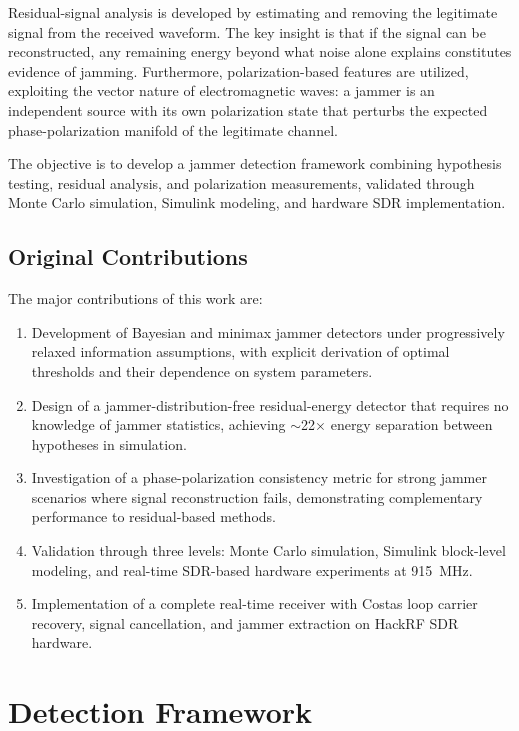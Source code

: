 \documentclass{article}
\begin{document}
Residual-signal analysis is developed by estimating and removing the legitimate signal from the received waveform. The key insight is that if the signal can be reconstructed, any remaining energy beyond what noise alone explains constitutes evidence of jamming. Furthermore, polarization-based features are utilized, exploiting the vector nature of electromagnetic waves: a jammer is an independent source with its own polarization state that perturbs the expected phase-polarization manifold of the legitimate channel.

The objective is to develop a jammer detection framework combining hypothesis testing, residual analysis, and polarization measurements, validated through Monte Carlo simulation, Simulink modeling, and hardware SDR implementation.

\subsection*{Original Contributions}

The major contributions of this work are:

\begin{enumerate}
\item Development of Bayesian and minimax jammer detectors under progressively relaxed information assumptions, with explicit derivation of optimal thresholds and their dependence on system parameters.
\item Design of a jammer-distribution-free residual-energy detector that requires no knowledge of jammer statistics, achieving $\sim$22$\times$ energy separation between hypotheses in simulation.
\item Investigation of a phase-polarization consistency metric for strong jammer scenarios where signal reconstruction fails, demonstrating complementary performance to residual-based methods.
\item Validation through three levels: Monte Carlo simulation, Simulink block-level modeling, and real-time SDR-based hardware experiments at 915~MHz.
\item Implementation of a complete real-time receiver with Costas loop carrier recovery, signal cancellation, and jammer extraction on HackRF SDR hardware.
\end{enumerate}

\newpage

\section{Detection Framework}
\end{document}
